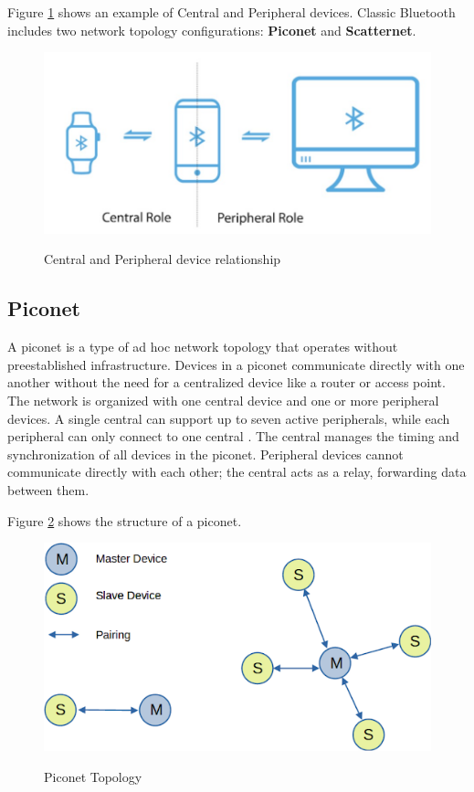 Figure \ref{fig:centralperipheral} shows an example of Central and Peripheral devices. Classic Bluetooth includes two network topology configurations: \textbf{Piconet} and \textbf{Scatternet}.

\begin{figure}[h]
    \caption{Central and Peripheral device relationship}
    \includegraphics[scale=.4]{centralperipheral.png}
    \label{fig:centralperipheral}
    \end{figure}

\subsection{Piconet}

A piconet is a type of ad hoc network topology that operates without preestablished infrastructure. Devices in a piconet communicate directly with one another without the need for a centralized device like a router or access point. The network is organized with one central device and one or more peripheral devices. A single central can support up to seven active peripherals, while each peripheral can only connect to one central \cite{nextgenBLE}. The central manages the timing and synchronization of all devices in the piconet. Peripheral devices cannot communicate directly with each other; the central acts as a relay, forwarding data between them.

Figure \ref{fig:piconet} shows the structure of a piconet.

\begin{figure}[h]
    \caption{Piconet Topology}
    \includegraphics[scale=.6]{piconet.png}
    \label{fig:piconet}
    \end{figure}

